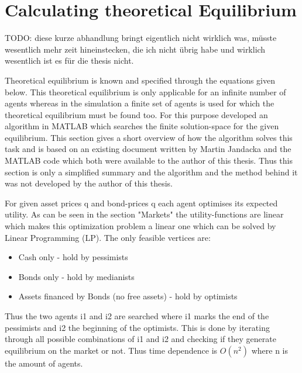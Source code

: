 \documentclass[Bachelorarbeit.tex]{subfiles}
\begin{document}
\section{Calculating theoretical Equilibrium}
TODO: diese kurze abhandlung bringt eigentlich nicht wirklich was, müsste wesentlich mehr zeit hineinstecken, die ich nicht übrig habe und wirklich wesentlich ist es für die thesis nicht.

Theoretical equilibrium is known and specified through the equations given below. This theoretical equilibrium is only applicable for an infinite number of agents whereas in the simulation a finite set of agents is used for which the theoretical equilibrium must be found too. For this purpose \cite{Breuer2015} developed an algorithm in MATLAB which searches the finite solution-space for the given equilibrium. This section gives a short overview of how the algorithm solves this task and is based on an existing document written by Martin Jandacka and the MATLAB code which both were available to the author of this thesis. Thus this section is only a simplified summary and the algorithm and the method behind it was not developed by the author of this thesis.

\medskip

For given asset prices q and bond-prices q each agent optimises its expected utility. As can be seen in the section "Markets" the utility-functions are linear which makes this optimization problem a linear one which can be solved by Linear Programming (LP). The only feasible vertices are:

\begin{itemize}
\item Cash only - hold by pessimists
\item Bonds only - hold by medianists
\item Assets financed by Bonds (no free assets) - hold by optimists 
\end{itemize}

Thus the two agents i1 and i2 are searched where i1 marks the end of the pessimists and i2 the beginning of the optimists. This is done by iterating through all possible combinations of i1 and i2 and checking if they generate equilibrium on the market or not. Thus time dependence is $O(n^2)$ where n is the amount of agents. 
\end{document}
